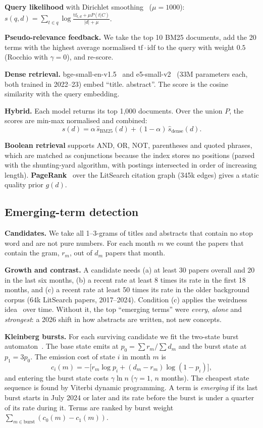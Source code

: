 \documentclass[10pt,twocolumn]{article}
\begin{document}
\textbf{Query likelihood} with Dirichlet smoothing~\cite{zhai2001} ($\mu=1000$):
$s(q,d)=\sum_{t\in q}\log\frac{\mathrm{tf}_{t,d}+\mu P(t|C)}{|d|+\mu}$.

\textbf{Pseudo-relevance feedback.} We take the top 10 BM25 documents, add the 20
terms with the highest average normalised $\mathrm{tf}\cdot\mathrm{idf}$ to the query
with weight $0.5$ (Rocchio with $\gamma=0$), and re-score.

\textbf{Dense retrieval.} bge-small-en-v1.5~\cite{xiao2024} and
e5-small-v2~\cite{wang2022} (33M parameters each, both trained in 2022--23) embed
``title. abstract''. The score is the cosine similarity with the query embedding.

\textbf{Hybrid.} Each model returns its top 1{,}000 documents. Over the union
$P$, the scores are min-max normalised and combined:
\begin{equation}
s(d)=\alpha\,\hat s_{\text{BM25}}(d)+(1-\alpha)\,\hat s_{\text{dense}}(d).
\end{equation}

\textbf{Boolean retrieval} supports AND, OR, NOT, parentheses and quoted phrases, which are matched as conjunctions because the index stores no positions (parsed
with the shunting-yard algorithm, with postings intersected in order of increasing
length). \textbf{PageRank}~\cite{page1999} over the LitSearch citation graph
(345k edges) gives a static quality prior $g(d)$.

\subsection{Emerging-term detection}
\textbf{Candidates.} We take all 1--3-grams of titles and abstracts that contain no
stop word and are not pure numbers. For each month $m$ we count the papers that
contain the gram, $r_m$, out of $d_m$ papers that month.

\textbf{Growth and contrast.} A candidate needs (a) at least 30 papers overall and 20
in the last six months, (b) a recent rate at least 8 times its rate in the first 18
months, and (c) a recent rate at least 50 times its rate in the older
background corpus (64k LitSearch papers, 2017--2024). Condition (c) applies the
weirdness idea~\cite{ahmad1999} over time. Without it, the top ``emerging terms''
were \emph{every}, \emph{alone} and \emph{strongest}: a 2026 shift in how abstracts
are written, not new concepts.

\textbf{Kleinberg bursts.} For each surviving candidate we fit the two-state burst
automaton~\cite{kleinberg2002}. The base state emits at $p_0=\sum r_m/\sum d_m$ and the
burst state at $p_1=3p_0$. The emission cost of state $i$ in month $m$ is
\begin{equation}
c_i(m)=-\big[r_m\log p_i+(d_m-r_m)\log(1-p_i)\big],
\end{equation}
and entering the burst state costs $\gamma\ln n$ ($\gamma=1$, $n$ months). The
cheapest state sequence is found by Viterbi dynamic programming. A term is
\emph{emerging} if its last burst starts in July 2024 or later and its rate before
the burst is under a quarter of its rate during it. Terms are ranked by burst weight
$\sum_{m\in\text{burst}}(c_0(m)-c_1(m))$.
\end{document}
